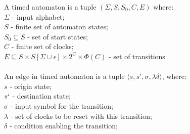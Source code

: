 \begin{definition}

A timed automaton is a tuple $(\Sigma, S, S_0, C, E)$ where:\\
$\Sigma$ - input alphabet;\\
$S$ - finite set of automaton states;\\
$S_0 \subseteq S$ - set of start states; \\
$C$ - finite set of clocks; \\
$E \subseteq S \times S [\Sigma \cup {\epsilon}] \times 2^C \times \Phi(C)$ - set of transitions\\\\
An edge in timed automaton is a tuple $\langle s, s', \sigma, \lambda \delta \rangle$, where:\\
$s$ - origin state;\\
$s`$ - destination state;\\
$\sigma$ - input symbol for the transition;\\
$\lambda$ - set of clocks to be reset with this transition;\\
$\delta$ - condition enabling the transition;\\
\label{def:automaton}
\end{definition}

